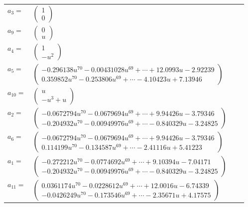 \documentclass[1p]{elsarticle_modified}
\theoremstyle{definition}
\begin{document}
\begin{tabular}{m{7pt} m{180pt} m{7pt} m{180pt} }
\flushright $a_{3}=$&$\begin{pmatrix}1\\0\end{pmatrix}$ \\
\flushright $a_{9}=$&$\begin{pmatrix}0\\u\end{pmatrix}$ \\
\flushright $a_{4}=$&$\begin{pmatrix}1\\- u^2\end{pmatrix}$ \\
\flushright $a_{5}=$&$\begin{pmatrix}-0.296138 u^{70}-0.00431028 u^{69}+\cdots+12.0993 u-2.92239\\0.359852 u^{70}-0.253806 u^{69}+\cdots-4.10423 u+7.13946\end{pmatrix}$ \\
\flushright $a_{10}=$&$\begin{pmatrix}u\\- u^3+u\end{pmatrix}$ \\
\flushright $a_{2}=$&$\begin{pmatrix}-0.0672794 u^{70}-0.0679694 u^{69}+\cdots+9.94426 u-3.79346\\-0.204932 u^{70}-0.00949976 u^{69}+\cdots-0.840329 u-3.24825\end{pmatrix}$ \\
\flushright $a_{6}=$&$\begin{pmatrix}-0.0672794 u^{70}-0.0679694 u^{69}+\cdots+9.94426 u-3.79346\\0.114199 u^{70}-0.134587 u^{69}+\cdots-2.41116 u+5.41223\end{pmatrix}$ \\
\flushright $a_{1}=$&$\begin{pmatrix}-0.272212 u^{70}-0.0774692 u^{69}+\cdots+9.10394 u-7.04171\\-0.204932 u^{70}-0.00949976 u^{69}+\cdots-0.840329 u-3.24825\end{pmatrix}$ \\
\flushright $a_{11}=$&$\begin{pmatrix}0.0361174 u^{70}-0.0228612 u^{69}+\cdots+12.0016 u-6.74339\\-0.0426249 u^{70}-0.173546 u^{69}+\cdots-2.35671 u+4.17575\end{pmatrix}$ \\

\end{tabular}
\end{document}
